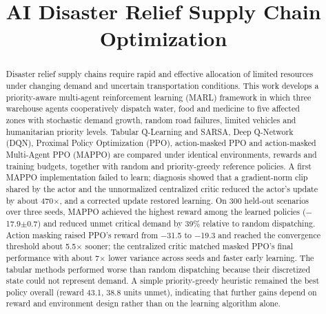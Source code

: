 \documentclass[conference]{IEEEtran}
\begin{document}
\title{AI Disaster Relief Supply Chain Optimization}

\author{
\and
{}
\and
{}
}

\maketitle

\begin{abstract}
Disaster relief supply chains require rapid and effective allocation of limited resources under changing demand and uncertain transportation conditions. This work develops a priority-aware multi-agent reinforcement learning (MARL) framework in which three warehouse agents cooperatively dispatch water, food and medicine to five affected zones with stochastic demand growth, random road failures, limited vehicles and humanitarian priority levels. Tabular Q-Learning and SARSA, Deep Q-Network (DQN), Proximal Policy Optimization (PPO), action-masked PPO and action-masked Multi-Agent PPO (MAPPO) are compared under identical environments, rewards and training budgets, together with random and priority-greedy reference policies. A first MAPPO implementation failed to learn; diagnosis showed that a gradient-norm clip shared by the actor and the unnormalized centralized critic reduced the actor's update by about 470$\times$, and a corrected update restored learning. On 300 held-out scenarios over three seeds, MAPPO achieved the highest reward among the learned policies ($-$17.9$\pm$0.7) and reduced unmet critical demand by 39\% relative to random dispatching. Action masking raised PPO's reward from $-$31.5 to $-$19.3 and reached the convergence threshold about 5.5$\times$ sooner; the centralized critic matched masked PPO's final performance with about 7$\times$ lower variance across seeds and faster early learning. The tabular methods performed worse than random dispatching because their discretized state could not represent demand. A simple priority-greedy heuristic remained the best policy overall (reward 43.1, 38.8 units unmet), indicating that further gains depend on reward and environment design rather than on the learning algorithm alone.
\end{abstract}
\end{document}
